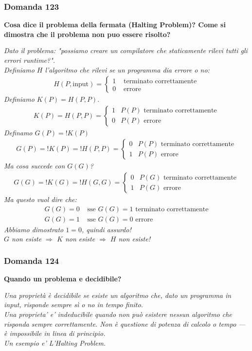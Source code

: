 \documentclass[12pt,a4paper,tikz,border=5pt]{article}
\newcommand{\domanda}[3]{%
  \subsubsection*{Domanda #1}
  \textbf{#2}
  \begin{mdframed}[backgroundcolor=grigiochiarissimo, linecolor=gray!50, linewidth=0.6pt, innertopmargin=6pt, innerbottommargin=12pt, innerleftmargin=8pt, innerrightmargin=8pt]
    \textit{#3}%
  \end{mdframed}%
  \vspace{0.4em}
}
\begin{document}
\domanda{123}{Cosa dice il problema della fermata (Halting Problem)? Come si dimostra che il problema non puo essere risolto?}{Dato il problema: "possiamo creare un compilatore che staticamente rilevi tutti gli errori runtime?".\\ 
Definiamo $H$ l'algoritmo che rilevi se un programma dia errore o no:
\begin{align*}
  H(P, \text{input}) = \begin{cases}
    1 & \text{ terminato correttamente}\\
    0 & \text{ errore}
  \end{cases}
\end{align*}
Definiamo $K(P)=H(P, P).$
\begin{align*}
  K(P) = H(P,P) = \begin{cases}
    1 & \text{$P(P)$ terminato correttamente}\\
    0 & \text{$P(P)$ errore}
  \end{cases}
\end{align*}
Definamo $G(P)=!K(P)$
\begin{align*}
  G(P) = !K(P) = !H(P,P) = \begin{cases}
    0 & \text{$P(P)$ terminato correttamente}\\
    1 & \text{$P(P)$ errore}
  \end{cases}
\end{align*}
Ma cosa succede con $G(G)$?
  \begin{align*}
  G(G) = !K(G) = !H(G,G) = \begin{cases}
    0 & \text{$P(G)$ terminato correttamente}\\
    1 & \text{$P(G)$ errore}
  \end{cases}
\end{align*}
Ma questo vuol dire che:
\begin{align*}
  G(G)=0 & \text{ sse } \text{$G(G)=1$ terminato correttamente}\\
  G(G)=1 & \text{ sse } \text{$G(G)=0$ errore}
\end{align*}
Abbiamo dimostrato $1=0$, quindi assurdo!\\
$G$ non esiste $\Rightarrow$ $K$ non esiste $\Rightarrow$ $H$ non esiste!
}

\domanda{124}{Quando un problema e decidibile?}{Una proprietà è decidibile se esiste un algoritmo che, dato un programma in input, risponde sempre sì o no in tempo finito.\\
Una proprieta' e' indeducibile quando non può esistere nessun algoritmo che risponda sempre correttamente. Non è questione di potenza di calcolo o tempo — è impossibile in linea di principio.\\
Un esempio e' L'Halting Problem.}
\end{document}
